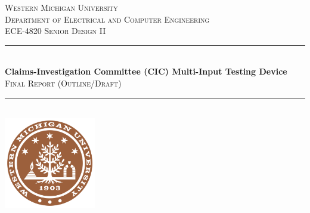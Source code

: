 \documentclass[12pt]{article}
\begin{document}
\begin{titlepage}
    \newcommand{\HRule}{\rule{\linewidth}{0.5mm}} %
    
    \center %
    
    
    \textsc{\LARGE Western Michigan University}\\[0.5cm]
    \textsc{\Large Department of Electrical and Computer Engineering}\\[0.5cm] 
    \textsc{\large ECE-4820 Senior Design II}\\[0.5cm] 
    
    
    \HRule \\[0.4cm]
    { \huge \bfseries  Claims-Investigation Committee (CIC) Multi-Input Testing Device}\\[0.4cm]  
    \textsc{\Large Final Report (Outline/Draft)}\\[0.4cm] 
    \HRule \\[1.5cm]
    
    
    \includegraphics[width=0.3\textwidth]{assets/WMU_Logo.png}\\[1cm]  
    

\end{titlepage}
\end{document}
